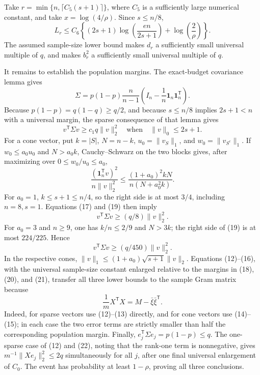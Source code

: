 Take \(r=\min\{n,\lceil C_5(s+1)\rceil\}\), where \(C_5\) is a sufficiently large numerical constant, and take \(x=\log(4/\rho)\).  Since \(s\le n/8\),
\[
 L_r\le C_6\left\{(2s+1)\log\!\left(\frac{en}{2s+1}\right)
                  +\log\!\left(\frac2\rho\right)\right\}.
 \tag{16}
\]
The assumed sample-size lower bound makes \(d_r\) a sufficiently small universal multiple of \(q\), and makes \(b_r^2\) a sufficiently small universal multiple of \(q\).

It remains to establish the population margins.  The exact-budget covariance lemma gives
\[
 \Sigma=p(1-p)\frac n{n-1}
 \left(I_n-\frac1n\mathbf1_n\mathbf1_n^{\mathsf T}\right).
 \tag{17}
\]
Because \(p(1-p)=q(1-q)\ge q/2\), and because \(s\le n/8\) implies \(2s+1<n\) with a universal margin, the sparse consequence of that lemma gives
\[
 v^{\mathsf T}\Sigma v\ge c_1q\lVert v\rVert_2^2
 \quad\text{when}\quad \lVert v\rVert_0\le2s+1.
 \tag{18}
\]
For a cone vector, put \(k=|S|\), \(N=n-k\), \(u_0=\lVert v_S\rVert_1\), and \(w_0=\lVert v_{S^c}\rVert_1\).  If \(w_0\le a_0u_0\) and \(N>a_0k\), Cauchy--Schwarz on the two blocks gives, after maximizing over \(0\le w_0/u_0\le a_0\),
\[
 \frac{(\mathbf1_n^{\mathsf T}v)^2}{n\lVert v\rVert_2^2}
 \le \frac{(1+a_0)^2kN}{n(N+a_0^2k)}.
 \tag{19}
\]
For \(a_0=1\), \(k\le s+1\le n/4\), so the right side is at most \(3/4\), including \(n=8,s=1\).  Equations (17) and (19) then imply
\[
 v^{\mathsf T}\Sigma v\ge(q/8)\lVert v\rVert_2^2.
 \tag{20}
\]
For \(a_0=3\) and \(n\ge9\), one has \(k/n\le2/9\) and \(N>3k\); the right side of (19) is at most \(224/225\).  Hence
\[
 v^{\mathsf T}\Sigma v\ge(q/450)\lVert v\rVert_2^2.
 \tag{21}
\]
In the respective cones, \(\lVert v\rVert_1\le(1+a_0)\sqrt{s+1}\lVert v\rVert_2\).  Equations (12)--(16), with the universal sample-size constant enlarged relative to the margins in (18), (20), and (21), transfer all three lower bounds to the sample Gram matrix because
\[
 \frac1mX^{\mathsf T}X=M-\bar\xi\bar\xi^{\mathsf T}.
 \tag{22}
\]
Indeed, for sparse vectors use (12)--(13) directly, and for cone vectors use (14)--(15); in each case the two error terms are strictly smaller than half the corresponding population margin.  Finally, \(e_j^{\mathsf T}\Sigma e_j=p(1-p)\le q\).  The one-sparse case of (12) and (22), noting that the rank-one term is nonnegative, gives \(m^{-1}\lVert Xe_j\rVert_2^2\le2q\) simultaneously for all \(j\), after one final universal enlargement of \(C_0\).  The event has probability at least \(1-\rho\), proving all three conclusions.
